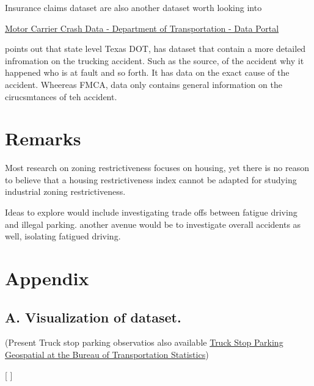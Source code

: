\documentclass[
  12pt]{article}
\begin{document}
Insurance claims dataset are also another dataset worth looking into

\href{https://data.transportation.gov/Trucking-and-Motorcoaches/Motor-Carrier-Crash-Data-/b8e5-isfj/about_data}{Motor
Carrier Crash Data - \textbar{} Department of Transportation - Data
Portal}

\citet{liangSafetyInspectionsImprove2021} points out that state level
Texas DOT, has dataset that contain a more detailed infromation on the
trucking accident. Such as the source, of the accident why it happened
who is at fault and so forth. It has data on the exact cause of the
accident. Wheereas FMCA, data only contains general information on the
cirucsmtances of teh accident.

\hypertarget{remarks}{%
\section{Remarks}\label{remarks}}

Most research on zoning restrictiveness focuses on housing, yet there is
no reason to believe that a housing restrictiveness index cannot be
adapted for studying industrial zoning restrictiveness.

Ideas to explore would include investigating trade offs between fatigue
driving and illegal parking. another avenue would be to investigate
overall accidents as well, isolating fatigued driving.

\hypertarget{appendix}{%
\section{\texorpdfstring{\textbf{Appendix}}{Appendix}}\label{appendix}}

\hypertarget{sec-a.-visualization-of-dataset.-}{%
\subsection{\texorpdfstring{\textbf{A. Visualization of
dataset.}}{A. Visualization of dataset.}}\label{sec-a.-visualization-of-dataset.-}}

(Present Truck stop parking observatios also available
\href{https://data-usdot.opendata.arcgis.com/datasets/usdot::truck-stop-parking/about}{Truck
Stop Parking \textbar{} Geospatial at the Bureau of Transportation
Statistics})

{[} \citet{coWilliamClintCResearchProposalTrucks2024}{]}
\end{document}
